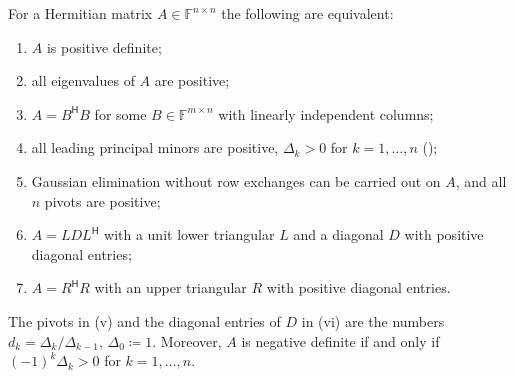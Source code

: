 \begin{theorem}
\label{thm:pd-criteria}
For a Hermitian matrix $A\in\mathbb F^{n\times n}$ the following are equivalent:
\begin{enumerate}
\item $A$ is positive definite;
\item all eigenvalues of $A$ are positive;
\item $A=B^{\mathsf H}B$ for some $B\in\mathbb F^{m\times n}$ with linearly independent columns;
\item all leading principal minors are positive, $\Delta_k>0$ for $k=1,\ldots,n$ ();
\item Gaussian elimination without row exchanges can be carried out on $A$, and all $n$ pivots are positive;
\item $A=LDL^{\mathsf H}$ with a unit lower triangular $L$ and a diagonal $D$ with positive diagonal entries;
\item $A=R^{\mathsf H}R$ with an upper triangular $R$ with positive diagonal entries.
\end{enumerate}
The pivots in (v) and the diagonal entries of $D$ in (vi) are the numbers $d_k=\Delta_k/\Delta_{k-1}$, $\Delta_0\coloneqq1$. Moreover, $A$ is negative definite if and only if $(-1)^k\Delta_k>0$ for $k=1,\ldots,n$.
\end{theorem}

